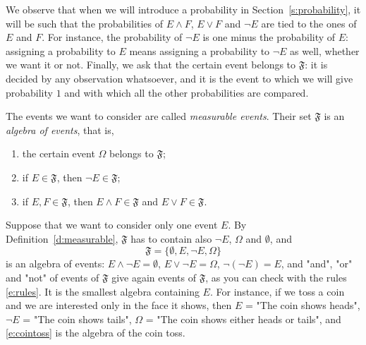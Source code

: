 We observe that when we will introduce a probability in Section~\ref{s:probability}, it will be such that the probabilities of $E \wedge F$, $E \vee F$ and $\neg E$ are tied to the ones of $E$ and $F$. For instance, the probability of $\neg E$ is one minus the probability of $E$: assigning a probability to $E$ means assigning a probability to $\neg E$ as well, whether we want it or not. Finally, we ask that the certain event belongs to $\mathfrak F$: it is decided by any observation whatsoever, and it is the event to which we will give probability $1$ and with which all the other probabilities are compared. 


\begin{definition}
	\label{d:measurable}
	The events we want to consider are called \emph{measurable events}. Their set $\mathfrak F$ is an \emph{algebra of events}, that is, 
	\begin{enumerate}
		\item the certain event $\Omega$ belongs to $\mathfrak F$;
		\item if $E \in \mathfrak F$, then $\neg E \in \mathfrak F$;
		\item if $E, F \in \mathfrak F$, then $E \wedge F \in \mathfrak F$ and $E \vee F \in \mathfrak F$.
	\end{enumerate}
\end{definition}

\begin{example}
	\label{ex:cointoss}
	Suppose that we want to consider only one event $E$. By Definition~\ref{d:measurable}, $\mathfrak F$ has to contain also $\neg E$, $\Omega$ and $\emptyset$, and 
	\begin{equation}
		\label{e:cointoss}
		\mathfrak F = \{ \emptyset, E, \neg E, \Omega \}
	\end{equation}
	is an algebra of events: $E \wedge \neg E = \emptyset$, $E \vee \neg E = \Omega$, $\neg(\neg E) = E$, and "and", "or" and "not" of events of $\mathfrak F$ give again events of $\mathfrak F$, as you can check with the rules \eqref{e:rules}. It is the smallest algebra containing $E$. 
	For instance, if we toss a coin and we are interested only in the face it shows, then $E$ = "The coin shows heads", $\neg E$ = "The coin shows tails", $\Omega$ = "The coin shows either heads or tails", and \eqref{e:cointoss} is the algebra of the coin toss. 
\end{example}


